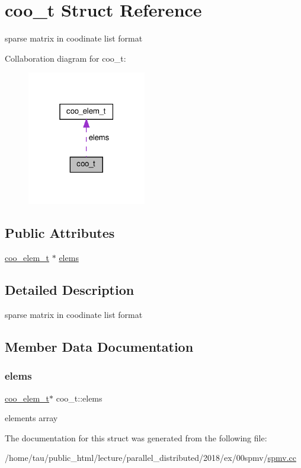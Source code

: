 \hypertarget{structcoo__t}{}\section{coo\+\_\+t Struct Reference}
\label{structcoo__t}


sparse matrix in coodinate list format  




Collaboration diagram for coo\+\_\+t\+:\nopagebreak
\begin{figure}[H]
\begin{center}
\leavevmode
\includegraphics[width=147pt]{structcoo__t__coll__graph}
\end{center}
\end{figure}
\subsection*{Public Attributes}
\begin{DoxyCompactItemize}
\item 
\hyperlink{structcoo__elem__t}{coo\+\_\+elem\+\_\+t} $\ast$ \hyperlink{structcoo__t_a3e74f1e3dadd34e5439f859fab277b54}{elems}
\end{DoxyCompactItemize}


\subsection{Detailed Description}
sparse matrix in coodinate list format 

\subsection{Member Data Documentation}
\mbox{\label{structcoo__t_a3e74f1e3dadd34e5439f859fab277b54}} 
\subsubsection{\texorpdfstring{elems}{elems}}
{\footnotesize\ttfamily \hyperlink{structcoo__elem__t}{coo\+\_\+elem\+\_\+t}$\ast$ coo\+\_\+t\+::elems}

elements array 

The documentation for this struct was generated from the following file\+:\begin{DoxyCompactItemize}
\item 
/home/tau/public\+\_\+html/lecture/parallel\+\_\+distributed/2018/ex/00spmv/\hyperlink{spmv_8cc}{spmv.\+cc}\end{DoxyCompactItemize}
